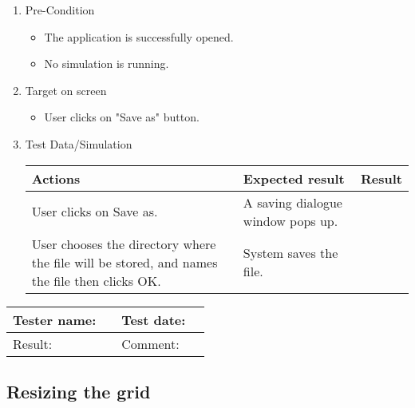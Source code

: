 \begin{enumerate}
	\item Pre-Condition
	\begin{itemize}
		\item The application is successfully opened.
		\item No simulation is running.
	\end{itemize}
	\item Target on screen
	\begin{itemize}
		\item User clicks on "Save as" button.
	\end{itemize}
	\item Test Data/Simulation
	\begin{tabularx}{\textwidth}{|X|X|p{2.5cm}|}\hline
		Actions & Expected result & Result \\\hline
		User clicks on Save as. & A saving dialogue window pops up. & \pass \\\hline
		User chooses the directory where the file will be stored, and names the file then clicks OK. & System saves the file. & \pass \\\hline 
	\end{tabularx}
\end{enumerate}

\begin{tabularx}{\textwidth}{|p{3cm}X|p{3cm}X|}\hline
	Tester name: &  & Test date: & \\\hline
	Result: &  \pass & Comment: & \\\hline
\end{tabularx}

\subsection{Resizing the grid}


